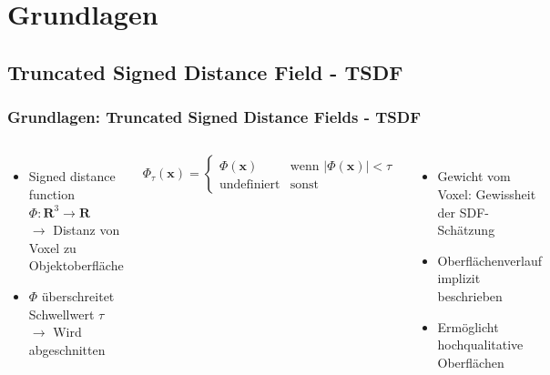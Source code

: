 \section{Grundlagen} 

\subsection*{Truncated Signed Distance Field - TSDF}

\begin{frame}[t]
    \frametitle{Grundlagen: Truncated Signed Distance Fields - TSDF}

    \begin{columns}[t]
      \column[]{7cm}
      
      \begin{itemize}
       \item Signed distance function $\Phi: \mathbf{R}^3 \to \mathbf{R}$ \\ $\rightarrow$ Distanz von Voxel zu Objektoberfläche
       \item $\Phi$ überschreitet Schwellwert $\tau$ \\ $\rightarrow$ Wird abgeschnitten 
      \end{itemize}
      \begin{equation*}
	      \Phi_{\tau}(\mathbf{x}) =
	      \begin{cases}
		      \Phi(\mathbf{x}) &  \text{wenn } | \Phi(\mathbf{x})| < \tau \\
		      \text{undefiniert} & \text{sonst}
	      \end{cases}
      \end{equation*}    
      \begin{itemize}
       \item  Gewicht vom Voxel: Gewissheit der SDF-Schätzung
       \item  Oberflächenverlauf implizit beschrieben
       \item Ermöglicht hochqualitative Oberflächen
      \end{itemize}
     

      \column{5cm}
      

\end{columns}
\end{frame}
